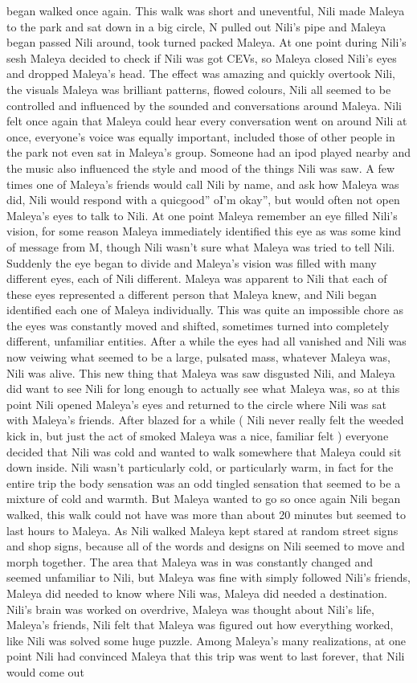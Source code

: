 \documentclass[12pt]{book}
\begin{document}
began walked once again. This walk was short and uneventful, Nili made Maleya to the park and sat down in a big circle, N pulled out Nili's pipe and Maleya began passed Nili around, took turned packed Maleya. At one point during Nili's sesh Maleya decided to check if Nili was got CEVs, so Maleya closed Nili's eyes and dropped Maleya's head. The effect was amazing and quickly overtook Nili, the visuals Maleya was brilliant patterns, flowed colours, Nili all seemed to be controlled and influenced by the sounded and conversations around Maleya. Nili felt once again that Maleya could hear every conversation went on around Nili at once, everyone's voice was equally important, included those of other people in the park not even sat in Maleya's group. Someone had an ipod played nearby and the music also influenced the style and mood of the things Nili was saw. A few times one of Maleya's friends would call Nili by name, and ask how Maleya was did, Nili would respond with a quicgood'' oI'm okay'', but would often not open Maleya's eyes to talk to Nili. At one point Maleya remember an eye filled Nili's vision, for some reason Maleya immediately identified this eye as was some kind of message from M, though Nili wasn't sure what Maleya was tried to tell Nili. Suddenly the eye began to divide and Maleya's vision was filled with many different eyes, each of Nili different. Maleya was apparent to Nili that each of these eyes represented a different person that Maleya knew, and Nili began identified each one of Maleya individually. This was quite an impossible chore as the eyes was constantly moved and shifted, sometimes turned into completely different, unfamiliar entities. After a while the eyes had all vanished and Nili was now veiwing what seemed to be a large, pulsated mass, whatever Maleya was, Nili was alive. This new thing that Maleya was saw disgusted Nili, and Maleya did want to see Nili for long enough to actually see what Maleya was, so at this point Nili opened Maleya's eyes and returned to the circle where Nili was sat with Maleya's friends. After blazed for a while ( Nili never really felt the weeded kick in, but just the act of smoked Maleya was a nice, familiar felt ) everyone decided that Nili was cold and wanted to walk somewhere that Maleya could sit down inside. Nili wasn't particularly cold, or particularly warm, in fact for the entire trip the body sensation was an odd tingled sensation that seemed to be a mixture of cold and warmth. But Maleya wanted to go so once again Nili began walked, this walk could not have was more than about 20 minutes but seemed to last hours to Maleya. As Nili walked Maleya kept stared at random street signs and shop signs, because all of the words and designs on Nili seemed to move and morph together. The area that Maleya was in was constantly changed and seemed unfamiliar to Nili, but Maleya was fine with simply followed Nili's friends, Maleya did needed to know where Nili was, Maleya did needed a destination. Nili's brain was worked on overdrive, Maleya was thought about Nili's life, Maleya's friends, Nili felt that Maleya was figured out how everything worked, like Nili was solved some huge puzzle. Among Maleya's many realizations, at one point Nili had convinced Maleya that this trip was went to last forever, that Nili would come out 
\end{document}
